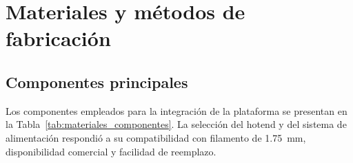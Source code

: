
\section{Materiales y métodos de fabricación}
\subsection{Componentes principales}
Los componentes empleados para la integración de la plataforma se presentan en la Tabla~\ref{tab:materiales_componentes}. La selección del hotend y del sistema de alimentación respondió a su compatibilidad con filamento de \SI{1.75}{\milli\metre}, disponibilidad comercial y facilidad de reemplazo.
